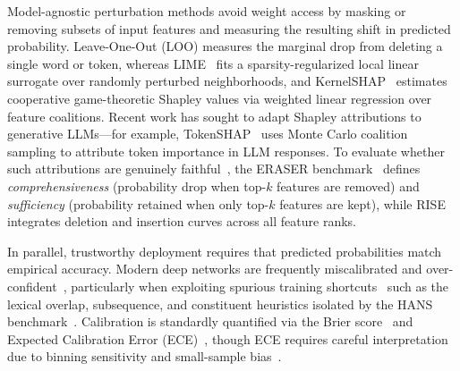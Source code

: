 \documentclass[10pt]{article}
\begin{document}
Model-agnostic perturbation methods avoid weight access by masking or removing subsets of input features and measuring the resulting shift in predicted probability.
Leave-One-Out (LOO) measures the marginal drop from deleting a single word or token, whereas LIME~\cite{ribeiro2016} fits a sparsity-regularized local linear surrogate over randomly perturbed neighborhoods, and KernelSHAP~\cite{lundberg2017} estimates cooperative game-theoretic Shapley values via weighted linear regression over feature coalitions.
Recent work has sought to adapt Shapley attributions to generative LLMs---for example, TokenSHAP~\cite{goldshmidt2024tokenshap} uses Monte Carlo coalition sampling to attribute token importance in LLM responses.
To evaluate whether such attributions are genuinely faithful~\cite{jacovi2020}, the ERASER benchmark~\cite{deyoung2020} defines \emph{comprehensiveness} (probability drop when top-$k$ features are removed) and \emph{sufficiency} (probability retained when only top-$k$ features are kept), while RISE~\cite{petsiuk2018} integrates deletion and insertion curves across all feature ranks.

In parallel, trustworthy deployment requires that predicted probabilities match empirical accuracy.
Modern deep networks are frequently miscalibrated and over-confident~\cite{guo2017}, particularly when exploiting spurious training shortcuts~\cite{geirhos2020} such as the lexical overlap, subsequence, and constituent heuristics isolated by the HANS benchmark~\cite{mccoy2019}.
Calibration is standardly quantified via the Brier score~\cite{brier1950} and Expected Calibration Error (ECE)~\cite{naeini2015}, though ECE requires careful interpretation due to binning sensitivity and small-sample bias~\cite{nixon2019}.
\end{document}
